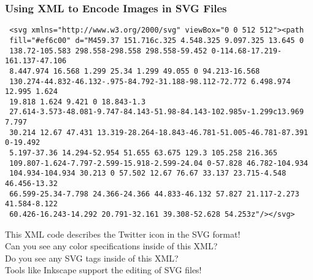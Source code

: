 \documentclass[14pt,aspectratio=169]{beamer}
\begin{document}
%
\begin{frame}[fragile]
  \frametitle{Using XML to Encode Images in SVG Files}
  \normalsize
  \begin{minipage}{6in}
    \vspace*{.05in}
    \begin{verbatim}
 <svg xmlns="http://www.w3.org/2000/svg" viewBox="0 0 512 512"><path
 fill="#ef6c00" d="M459.37 151.716c.325 4.548.325 9.097.325 13.645 0
 138.72-105.583 298.558-298.558 298.558-59.452 0-114.68-17.219-161.137-47.106
 8.447.974 16.568 1.299 25.34 1.299 49.055 0 94.213-16.568
 130.274-44.832-46.132-.975-84.792-31.188-98.112-72.772 6.498.974 12.995 1.624
 19.818 1.624 9.421 0 18.843-1.3
 27.614-3.573-48.081-9.747-84.143-51.98-84.143-102.985v-1.299c13.969 7.797
 30.214 12.67 47.431 13.319-28.264-18.843-46.781-51.005-46.781-87.391 0-19.492
 5.197-37.36 14.294-52.954 51.655 63.675 129.3 105.258 216.365
 109.807-1.624-7.797-2.599-15.918-2.599-24.04 0-57.828 46.782-104.934
 104.934-104.934 30.213 0 57.502 12.67 76.67 33.137 23.715-4.548 46.456-13.32
 66.599-25.34-7.798 24.366-24.366 44.833-46.132 57.827 21.117-2.273 41.584-8.122
 60.426-16.243-14.292 20.791-32.161 39.308-52.628 54.253z"/></svg>
    \end{verbatim}
  \end{minipage}
  \vspace*{.05in}
  \begin{center}
    This XML code describes the Twitter icon in the SVG format! \\
    Can you see any color specifications inside of this XML? \\
    Do you see any SVG tags inside of this XML? \\
    Tools like Inkscape support the editing of SVG files!
  \end{center}
\end{frame}
\end{document}
